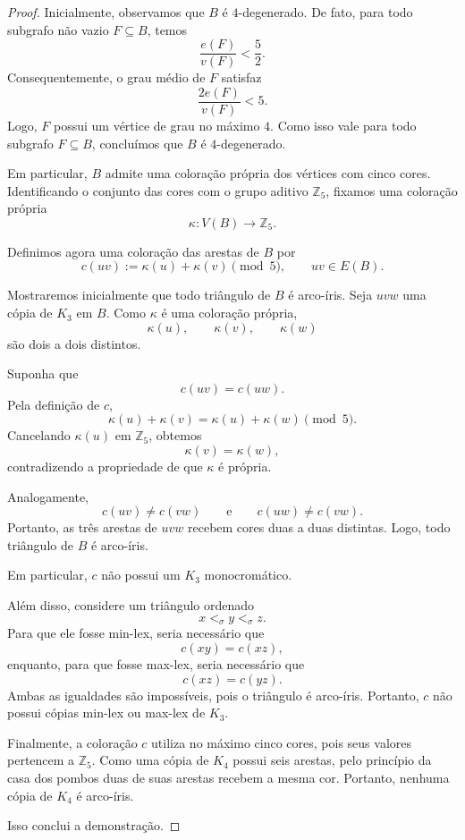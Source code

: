 \documentclass[reqno, 12pt]{amsart}
\numberwithin{equation}{section}
\theoremstyle{plain}
\theoremstyle{definition}
\begin{document}
\begin{proof}
  Inicialmente, observamos que $B$ é $4$-degenerado. De fato, para
  todo subgrafo não vazio $F\subseteq B$, temos
  \[
    \frac{e(F)}{v(F)}<\frac52.
  \]
  Consequentemente, o grau médio de $F$ satisfaz
  \[
    \frac{2e(F)}{v(F)}<5.
  \]
  Logo, $F$ possui um vértice de grau no máximo $4$. Como isso vale
  para todo subgrafo $F\subseteq B$, concluímos que $B$ é
  $4$-degenerado.

  Em particular, $B$ admite uma coloração própria dos vértices com
  cinco cores. Identificando o conjunto das cores com o grupo
  aditivo $\mathbb{Z}_5$, fixamos uma coloração própria
  \[
    \kappa:V(B)\longrightarrow\mathbb{Z}_5.
  \]

  Definimos agora uma coloração das arestas de $B$ por
  \[
    c(uv):=\kappa(u)+\kappa(v)\pmod 5,
    \qquad uv\in E(B).
  \]

  Mostraremos inicialmente que todo triângulo de $B$ é arco-íris.
  Seja $uvw$ uma cópia de $K_3$ em $B$. Como $\kappa$ é uma
  coloração própria,
  \[
    \kappa(u),\qquad
    \kappa(v),\qquad
    \kappa(w)
  \]
  são dois a dois distintos.

  Suponha que
  \[
    c(uv)=c(uw).
  \]
  Pela definição de $c$,
  \[
    \kappa(u)+\kappa(v)
    =
    \kappa(u)+\kappa(w)
    \pmod 5.
  \]
  Cancelando $\kappa(u)$ em $\mathbb{Z}_5$, obtemos
  \[
    \kappa(v)=\kappa(w),
  \]
  contradizendo a propriedade de que $\kappa$ é própria.

  Analogamente,
  \[
    c(uv)\neq c(vw)
    \qquad\text{e}\qquad
    c(uw)\neq c(vw).
  \]
  Portanto, as três arestas de $uvw$ recebem cores duas a duas
  distintas. Logo, todo triângulo de $B$ é arco-íris.

  Em particular, $c$ não possui um $K_3$ monocromático.

  Além disso, considere um triângulo ordenado
  \[
    x<_\sigma y<_\sigma z.
  \]
  Para que ele fosse min-lex, seria necessário que
  \[
    c(xy)=c(xz),
  \]
  enquanto, para que fosse max-lex, seria necessário que
  \[
    c(xz)=c(yz).
  \]
  Ambas as igualdades são impossíveis, pois o triângulo é
  arco-íris. Portanto, $c$ não possui cópias min-lex ou max-lex de
  $K_3$.

  Finalmente, a coloração $c$ utiliza no máximo cinco cores, pois
  seus valores pertencem a $\mathbb{Z}_5$. Como uma cópia de $K_4$
  possui seis arestas, pelo princípio da casa dos pombos duas de
  suas arestas recebem a mesma cor. Portanto, nenhuma cópia de
  $K_4$ é arco-íris.

  Isso conclui a demonstração.
\end{proof}




\printbibliography
\end{document}

